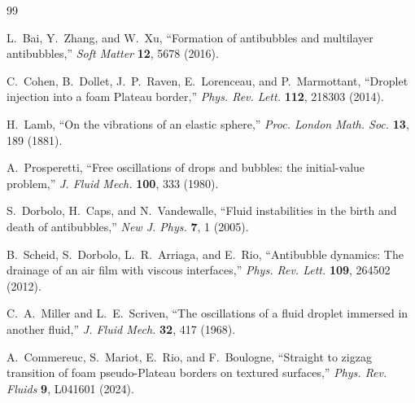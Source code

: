 \documentclass[%
 preprint,
 superscriptaddress,
 amsmath,amssymb,
 aps, prl,
]{revtex4-2}
\begin{document}
\begin{thebibliography}{99}

L.~Bai, Y.~Zhang, and W.~Xu,
``Formation of antibubbles and multilayer antibubbles,''
\textit{Soft Matter} \textbf{12}, 5678 (2016).

C.~Cohen, B.~Dollet, J.~P.~Raven, E.~Lorenceau, and P.~Marmottant,
``Droplet injection into a foam Plateau border,''
\textit{Phys. Rev. Lett.} \textbf{112}, 218303 (2014).

H.~Lamb,
``On the vibrations of an elastic sphere,''
\textit{Proc. London Math. Soc.} \textbf{13}, 189 (1881).

A.~Prosperetti,
``Free oscillations of drops and bubbles: the initial-value problem,''
\textit{J. Fluid Mech.} \textbf{100}, 333 (1980).

S.~Dorbolo, H.~Caps, and N.~Vandewalle,
``Fluid instabilities in the birth and death of antibubbles,''
\textit{New J. Phys.} \textbf{7}, 1 (2005).

B.~Scheid, S.~Dorbolo, L.~R.~Arriaga, and E.~Rio,
``Antibubble dynamics: The drainage of an air film with viscous interfaces,''
\textit{Phys. Rev. Lett.} \textbf{109}, 264502 (2012).

C.~A.~Miller and L.~E.~Scriven,
``The oscillations of a fluid droplet immersed in another fluid,''
\textit{J. Fluid Mech.} \textbf{32}, 417 (1968).

A.~Commereuc, S.~Mariot, E.~Rio, and F.~Boulogne,
``Straight to zigzag transition of foam pseudo-Plateau borders on textured surfaces,''
\textit{Phys. Rev. Fluids} \textbf{9}, L041601 (2024).

\end{thebibliography}
\end{document}
